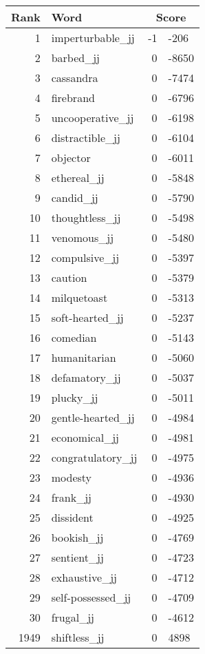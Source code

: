 \begin{longtable}[!htbp]{| rlr@{.}l |}
    \hline
    \textbf{Rank} & \textbf{Word} & \multicolumn{2}{c|}{\textbf{Score}} \\
    \hline
    \endhead
    1 & imperturbable\_jj & -1 & -206 \\
    2 & barbed\_jj & 0 & -8650 \\
    3 & cassandra & 0 & -7474 \\
    4 & firebrand & 0 & -6796 \\
    5 & uncooperative\_jj & 0 & -6198 \\
    6 & distractible\_jj & 0 & -6104 \\
    7 & objector & 0 & -6011 \\
    8 & ethereal\_jj & 0 & -5848 \\
    9 & candid\_jj & 0 & -5790 \\
    10 & thoughtless\_jj & 0 & -5498 \\
    11 & venomous\_jj & 0 & -5480 \\
    12 & compulsive\_jj & 0 & -5397 \\
    13 & caution & 0 & -5379 \\
    14 & milquetoast & 0 & -5313 \\
    15 & soft-hearted\_jj & 0 & -5237 \\
    16 & comedian & 0 & -5143 \\
    17 & humanitarian & 0 & -5060 \\
    18 & defamatory\_jj & 0 & -5037 \\
    19 & plucky\_jj & 0 & -5011 \\
    20 & gentle-hearted\_jj & 0 & -4984 \\
    21 & economical\_jj & 0 & -4981 \\
    22 & congratulatory\_jj & 0 & -4975 \\
    23 & modesty & 0 & -4936 \\
    24 & frank\_jj & 0 & -4930 \\
    25 & dissident & 0 & -4925 \\
    26 & bookish\_jj & 0 & -4769 \\
    27 & sentient\_jj & 0 & -4723 \\
    28 & exhaustive\_jj & 0 & -4712 \\
    29 & self-possessed\_jj & 0 & -4709 \\
    30 & frugal\_jj & 0 & -4612 \\
    1949 & shiftless\_jj & 0 & 4898 \\

\end{longtable}
